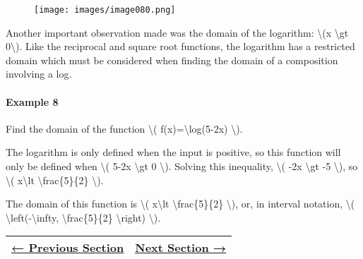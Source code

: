 \begin{figure}
\centering
\texttt{[image: images/image080.png]}
\caption{}
\end{figure}

Another important observation made was the domain of the logarithm:
\textbackslash{}(x \textbackslash{}gt 0\textbackslash{}). Like the
reciprocal and square root functions, the logarithm has a restricted
domain which must be considered when finding the domain of a composition
involving a log.

\hypertarget{example-8}{%
\paragraph{Example 8}\label{example-8}}

Find the domain of the function \textbackslash{}(
f(x)=\textbackslash{}log(5-2x) \textbackslash{}).

The logarithm is only defined when the input is positive, so this
function will only be defined when \textbackslash{}( 5-2x
\textbackslash{}gt 0 \textbackslash{}). Solving this inequality,
\textbackslash{}( -2x \textbackslash{}gt -5 \textbackslash{}), so
\textbackslash{}( x\textbackslash{}lt \textbackslash{}frac\{5\}\{2\}
\textbackslash{}).

The domain of this function is \textbackslash{}( x\textbackslash{}lt
\textbackslash{}frac\{5\}\{2\} \textbackslash{}), or, in interval
notation, \textbackslash{}( \textbackslash{}left(-\textbackslash{}infty,
\textbackslash{}frac\{5\}\{2\} \textbackslash{}right) \textbackslash{}).

\begin{longtable}[]{@{}ll@{}}
\toprule
\endhead
\href{section1-7.php}{← Previous Section} &
\href{../chapter2/section2-1.php}{Next Section →}\tabularnewline
\bottomrule
\end{longtable}
